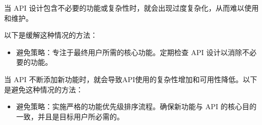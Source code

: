当 API 设计包含不必要的功能或复杂性时，就会出现过度复杂化，从而难以使用和维护。

以下是缓解这种情况的方法：

\begin{itemize}
\item
避免策略：专注于最终用户所需的核心功能。定期检查 API 设计以消除不必要的功能。
\end{itemize}

当 API 不断添加新功能时，就会导致API使用的复杂性增加和可用性降低。以下是避免这种情况的方法：

\begin{itemize}
\item
避免策略：实施严格的功能优先级排序流程。确保新功能与 API 的核心目的一致，并且是目标用户所必需的。
\end{itemize}
